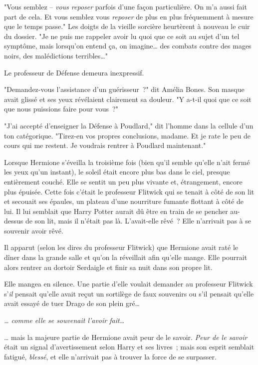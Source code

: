 "Vous semblez -- \emph{vous reposer} parfois d'une façon particulière. On m'a aussi fait part de cela. Et vous semblez vous \emph{reposer} de plus en plus fréquemment à mesure que le temps passe." Les doigts de la vieille sorcière heurtèrent à nouveau le cuir du dossier. "Je ne puis me rappeler avoir lu quoi que ce soit au sujet d'un tel symptôme, mais lorsqu'on entend ça, on imagine… des combats contre des mages noirs, des malédictions terribles…"

Le professeur de Défense demeura inexpressif.

"Demandez-vous l'assistance d'un guérisseur~?" dit Amélia Bones. Son masque avait glissé et ses yeux révélaient clairement sa douleur. "Y a-t-il quoi que ce soit que nous puissions faire pour vous~?"

"J'ai accepté d'enseigner la Défense à Poudlard," dit l'homme dans la cellule d'un ton catégorique. "Tirez-en vos propres conclusions, madame. Et je rate le peu de cours qui me restent. Je voudrais rentrer à Poudlard maintenant."

\later

Lorsque Hermione s'éveilla la troisième fois (bien qu'il semble qu'elle n'ait fermé les yeux qu'un instant), le soleil était encore plus bas dans le ciel, presque entièrement couché. Elle se sentit un peu plus vivante et, étrangement, encore plus épuisée. Cette fois c'était le professeur Flitwick qui se tenait à côté de son lit et secouait ses épaules, un plateau d'une nourriture fumante flottant à côté de lui. Il lui semblait que Harry Potter aurait dû être en train de se pencher au-dessus de son lit, mais il n'était pas là. L'avait-elle rêvé~? Elle n'arrivait pas à se souvenir avoir rêvé.

Il apparut (selon les dires du professeur Flitwick) que Hermione avait raté le dîner dans la grande salle et qu'on la réveillait afin qu'elle mange. Elle pourrait alors rentrer au dortoir Serdaigle et finir sa nuit dans son propre lit.

Elle mangea en silence. Une partie d'elle voulait demander au professeur Flitwick s'\emph{il} pensait qu'elle avait reçut un sortilège de faux souvenirs ou s'il pensait qu'elle avait essayé de tuer Drago de son plein gré…

\emph{… comme elle se souvenait l'avoir fait…}

… mais la majeure partie de Hermione avait peur de le savoir. \emph{Peur de le savoir} était un signal d'avertissement selon Harry et ses livres~; mais son esprit semblait fatigué, \emph{blessé}, et elle n'arrivait pas à trouver la force de se surpasser.

